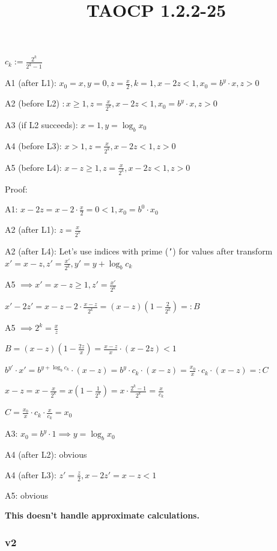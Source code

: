 \documentclass{article}
\title{TAOCP 1.2.2\mbox{-}25}
\begin{document}
\maketitle

\( c_{k} := \frac{2^{k}}{2^{k}-1} \)

A1 (after L1): \( x_{0} = x, y = 0, z = \frac{x}{2}, k = 1, x - 2z < 1, x_{0} = b^{y} \cdot x, z > 0 \)

A2 (before L2) \( : x \geq 1, z = \frac{x}{2^{k}}, x - 2z < 1, x_{0} = b^{y} \cdot x, z > 0 \)

A3 (if L2 succeeds): \( x = 1, y = \log_b{x_{0}} \)

A4 (before L3): \( x > 1, z = \frac{x}{2^{k}}, x - 2z < 1, z > 0 \)

A5 (before L4): \( x - z \geq 1, z = \frac{x}{2^{k}}, x - 2z < 1, z > 0 \)

Proof:

A1: \( x-2z = x - 2\cdot\frac{x}{2} = 0 < 1, x_{0} = b^{0} \cdot x_{0} \)

A2 (after L1): \( z = \frac{x}{2^{1}} \)

A2 (after L4): Let's use indices with prime (\texttt{'}) for values after transform \( x'=x-z, z'=\frac{x'}{2^{k}}, y'=y + \log_b{c_{k}} \)

A5 \( \implies x' = x - z \geq 1, z' = \frac{x'}{2^{k}} \)

\( x' - 2z'=x-z-2\cdot\frac{x-z}{2^{k}} = (x-z)(1 - \frac{2}{2^{k}}) =: B \)

A5 \( \implies 2^{k} = \frac{x}{z} \)

\( B = (x-z)(1-\frac{2z}{x}) = \frac{x-z}{x}\cdot(x-2z) < 1 \)

\( b^{y'}\cdot x' = b^{y + \log_b{c_{k}}} \cdot (x-z) = b^{y} \cdot c_{k} \cdot (x-z) = \frac{x_{0}}{x} \cdot c_{k} \cdot (x-z) =: C \)

\( x - z = x - \frac{x}{2^{k}} = x(1 - \frac{1}{2^{k}}) = x \cdot \frac{2^{k} - 1}{2^{k}} = \frac{x}{c_{k}} \)

\( C = \frac{x_{0}}{x} \cdot c_{k} \cdot \frac{x}{c_{k}} = x_{0} \)

A3: \( x_{0} = b^{y}\cdot 1 \implies y = \log_{b}{x_{0}} \)

A4 (after L2): obvious

A4 (after L3): \( z' = \frac{z}{2}, x-2z' = x-z < 1 \)

A5: obvious

\textbf{This doesn't handle approximate calculations.}

\subsubsection*{v2}
\end{document}
